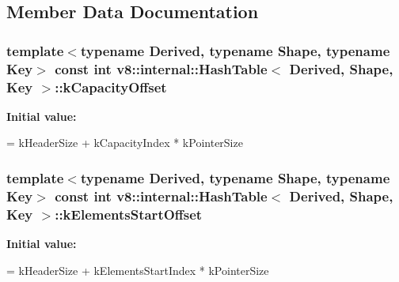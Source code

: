 \subsection{Member Data Documentation}
\subsubsection[{\texorpdfstring{k\+Capacity\+Offset}{kCapacityOffset}}]{\setlength{\rightskip}{0pt plus 5cm}template$<$typename Derived, typename Shape, typename Key$>$ const int {\bf v8\+::internal\+::\+Hash\+Table}$<$ Derived, Shape, Key $>$\+::k\+Capacity\+Offset\hspace{0.3cm}{\ttfamily [static]}}\hypertarget{classv8_1_1internal_1_1_hash_table_a7ed978a6c4e826d387ef137a9734f88a}{}\label{classv8_1_1internal_1_1_hash_table_a7ed978a6c4e826d387ef137a9734f88a}
{\bfseries Initial value\+:}
\begin{DoxyCode}
=
      kHeaderSize + kCapacityIndex * kPointerSize
\end{DoxyCode}
\subsubsection[{\texorpdfstring{k\+Elements\+Start\+Offset}{kElementsStartOffset}}]{\setlength{\rightskip}{0pt plus 5cm}template$<$typename Derived, typename Shape, typename Key$>$ const int {\bf v8\+::internal\+::\+Hash\+Table}$<$ Derived, Shape, Key $>$\+::k\+Elements\+Start\+Offset\hspace{0.3cm}{\ttfamily [static]}}\hypertarget{classv8_1_1internal_1_1_hash_table_ae8624ace4a507ce7d6e0686a0aaf5718}{}\label{classv8_1_1internal_1_1_hash_table_ae8624ace4a507ce7d6e0686a0aaf5718}
{\bfseries Initial value\+:}
\begin{DoxyCode}
=
      kHeaderSize + kElementsStartIndex * kPointerSize
\end{DoxyCode}
